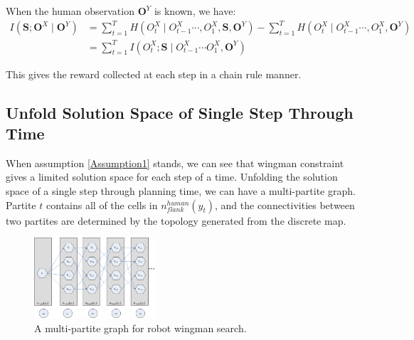 \documentclass[12pt]{article}
\begin{document}
\begin{lem} 
\label{Lemma1}
When the human observation $ \textbf{O}^{Y} $ is known, we have:
\begin{equation}
\label{eq:offHmPathChain}
\begin{aligned}
I(\textbf{S}; \textbf{O}^{X} \mid \textbf{O}^{Y}) & = \sum_{t=1}^{T} H(O_{t}^{X} \mid O_{t-1}^{X} \cdots, O_{1}^{X}, \textbf{S}, \textbf{O}^{Y}) - \sum_{t=1}^{T} H(O_{t}^{X} \mid O_{t-1}^{X} \cdots, O_{1}^{X}, \textbf{O}^{Y})\\
& = \sum_{t=1}^{T} I(O^{X}_{t} ; \textbf{S} \mid O^{X}_{t-1} \cdots O^{X}_{1}, \textbf{O}^{Y})
\end{aligned}
\end{equation}
\end{lem}

This gives the reward collected at each step in a chain rule manner. 

\subsection{Unfold Solution Space of Single Step Through Time}

When assumption \ref{Assumption1} stands, we can see that wingman constraint gives a limited solution space for each step of a time. Unfolding the solution space of a single step through planning time, we can have a multi-partite graph. Partite $ t $ contains all of the cells in $ n^{human}_{flank}(y_{t}) $, and the connectivities between two partites are determined by the topology generated from the discrete map.

\begin{figure}[htbp]
\centering
\includegraphics[width=0.4\textwidth]{./images/MultiPartite}
\caption{A multi-partite graph for robot wingman search.}
\label{fig:MultiPartite}
\end{figure}
\end{document}
